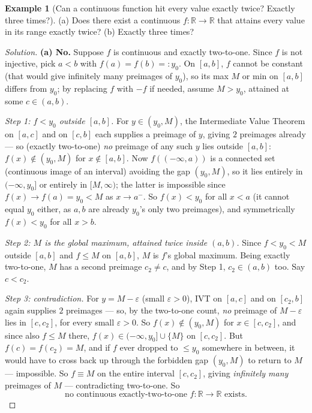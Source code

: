 \documentclass[11pt]{article}
\theoremstyle{definition}
\newtheorem{example}{Example}[section]
\newcommand{\R}{\mathbb{R}}
\begin{document}
\begin{example}[Can a continuous function hit every value exactly twice? Exactly three times?]
(a) Does there exist a continuous $f:\R\to\R$ that attains every value in its range exactly twice? (b) Exactly three times?
\end{example}

\begin{proof}[Solution]
\textbf{(a) No.} Suppose $f$ is continuous and exactly two-to-one. Since $f$ is not injective, pick $a<b$ with $f(a)=f(b)=:y_0$. On $[a,b]$, $f$ cannot be constant (that would give infinitely many preimages of $y_0$), so its max $M$ or min on $[a,b]$ differs from $y_0$; by replacing $f$ with $-f$ if needed, assume $M>y_0$, attained at some $c\in(a,b)$.

\emph{Step 1: $f<y_0$ outside $[a,b]$.} For $y\in(y_0,M)$, the Intermediate Value Theorem on $[a,c]$ and on $[c,b]$ each supplies a preimage of $y$, giving $2$ preimages already — so (exactly two-to-one) \emph{no} preimage of any such $y$ lies outside $[a,b]$: $f(x)\notin(y_0,M)$ for $x\notin[a,b]$. Now $f((-\infty,a))$ is a connected set (continuous image of an interval) avoiding the gap $(y_0,M)$, so it lies entirely in $(-\infty,y_0]$ or entirely in $[M,\infty)$; the latter is impossible since $f(x)\to f(a)=y_0<M$ as $x\to a^-$. So $f(x)<y_0$ for all $x<a$ (it cannot equal $y_0$ either, as $a,b$ are already $y_0$'s only two preimages), and symmetrically $f(x)<y_0$ for all $x>b$.

\emph{Step 2: $M$ is the global maximum, attained twice inside $(a,b)$.} Since $f<y_0<M$ outside $[a,b]$ and $f\le M$ on $[a,b]$, $M$ is $f$'s global maximum. Being exactly two-to-one, $M$ has a second preimage $c_2\neq c$, and by Step 1, $c_2\in(a,b)$ too. Say $c<c_2$.

\emph{Step 3: contradiction.} For $y=M-\varepsilon$ (small $\varepsilon>0$), IVT on $[a,c]$ and on $[c_2,b]$ again supplies $2$ preimages — so, by the two-to-one count, \emph{no} preimage of $M-\varepsilon$ lies in $[c,c_2]$, for every small $\varepsilon>0$. So $f(x)\notin(y_0,M)$ for $x\in[c,c_2]$, and since also $f\le M$ there, $f(x)\in(-\infty,y_0]\cup\{M\}$ on $[c,c_2]$. But $f(c)=f(c_2)=M$, and if $f$ ever dropped to $\le y_0$ somewhere in between, it would have to cross back up through the forbidden gap $(y_0,M)$ to return to $M$ — impossible. So $f\equiv M$ on the entire interval $[c,c_2]$, giving \emph{infinitely many} preimages of $M$ — contradicting two-to-one. So
\[
\boxed{\text{no continuous exactly-two-to-one } f:\R\to\R \text{ exists}}.
\]


\end{proof}
\end{document}
